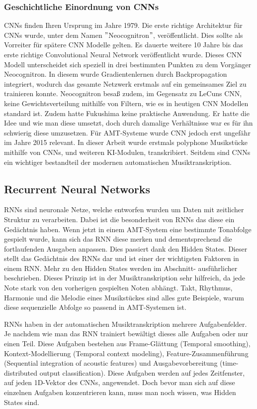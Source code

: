 \subsubsection*{Geschichtliche Einordnung von CNNs}
CNNs finden Ihren Ursprung im Jahre 1979.
Die erste richtige Architektur für CNNs wurde, unter dem Namen \("\)Neocognitron\("\), veröffentlicht.
\cite{fukushima1980neocognitron}
Dies sollte als Vorreiter für spätere CNN Modelle gelten.
Es dauerte weitere 10 Jahre bis das erste richtige Convolutional Neural Network veröffentlicht wurde.
\cite{lecun1989backpropagation}
Dieses CNN Modell unterscheidet sich speziell in drei bestimmten Punkten zu dem Vorgänger Neocognitron.
In diesem wurde Gradientenlernen durch Backpropagation integriert,
wodurch das gesamte Netzwerk erstmals auf ein gemeinsames Ziel zu trainieren konnte.
Neocognitron besaß zudem, im Gegensatz zu LeCuns CNN,
keine Gewichtsverteilung mithilfe von Filtern, wie es in heutigen CNN Modellen standard ist.
Zudem hatte Fukushima keine praktische Anwendung.
Er hatte die Idee und wie man diese umsetzt, doch durch damalige Verhältnisse war es für ihn schwierig diese umzusetzen.
Für AMT-Systeme wurde CNN jedoch erst ungefähr im Jahre 2015 relevant.
\cite{sigtia2016end}
In dieser Arbeit wurde erstmals polyphone Musikstücke mithilfe von CNNs, und weiteren KI-Modulen, transkribiert.
Seitdem sind CNNs ein wichtiger bestandteil der modernen automatischen Musiktranskription.

\subsection{Recurrent Neural Networks}
RNNs sind neuronale Netze, welche entworfen wurden um Daten mit zeitlicher Struktur zu verarbeiten.
Dabei ist die besonderheit von RNNs das diese ein Gedächtnis haben.
Wenn jetzt in einem AMT-System eine bestimmte Tonabfolge gespielt wurde,
kann sich das RNN diese merken und dementsprechend die fortlaufenden Ausgaben anpassen.
Dies passiert dank den Hidden States.
Dieser stellt das Gedächtnis des RNNs dar und ist einer der wichtigsten Faktoren in einem RNN\@.
Mehr zu den Hidden States werden im Abschnitt- ausführlicher beschrieben.
Dieses Prinzip ist in der Musiktranskription sehr hilfreich,
da jede Note stark von den vorherigen gespielten Noten abhängt.
Takt, Rhythmus, Harmonie und die Melodie eines Musikstückes sind alles gute Beispiele,
warum diese sequenzielle Abfolge so passend in AMT-Systemen ist.

RNNs haben in der automatischen Musiktranskription mehrere Aufgabenfelder.
Je nachdem wie man das RNN trainiert bewältigt dieses alle Aufgaben oder nur einen Teil.
Diese Aufgaben bestehen aus Frame-Glättung (Temporal smoothing), Kontext-Modellierung (Temporal context modeling),
Feature-Zusammenführung (Sequential integration of acoustic features)
und Ausgabevorbereitung (time-distributed output classification).
Diese Aufgaben werden auf jedes Zeitfenster, auf jeden 1D-Vektor des CNNs, angewendet.
Doch bevor man sich auf diese einzelnen Aufgaben konzentrieren kann, muss man noch wissen, was Hidden States sind.

